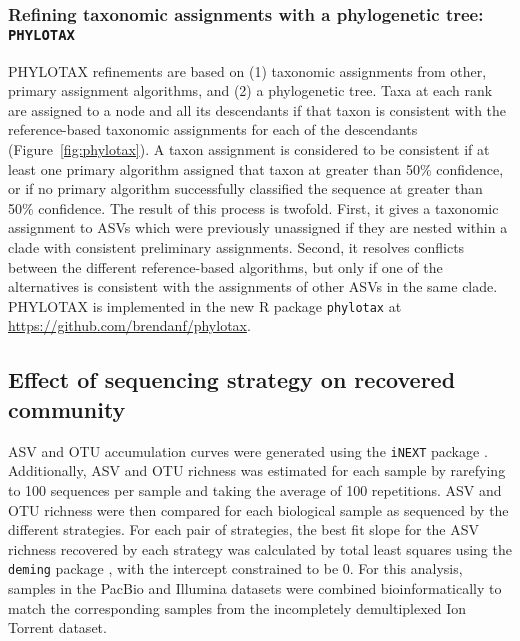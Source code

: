 \documentclass[
]{article}
\begin{document}
\hypertarget{phylotax}{%
\subsubsection{\texorpdfstring{Refining taxonomic assignments with a phylogenetic tree: \texttt{PHYLOTAX}}{Refining taxonomic assignments with a phylogenetic tree: PHYLOTAX}}\label{phylotax}}

PHYLOTAX refinements are based on (1) taxonomic assignments from other, primary assignment algorithms, and (2) a phylogenetic tree.
Taxa at each rank are assigned to a node and all its descendants if that taxon is consistent with the reference-based taxonomic assignments for each of the descendants (Figure~\ref{fig:phylotax}).
A taxon assignment is considered to be consistent if at least one primary algorithm assigned that taxon at greater than 50\% confidence, or if no primary algorithm successfully classified the sequence at greater than 50\% confidence.
The result of this process is twofold.
First, it gives a taxonomic assignment to ASVs which were previously unassigned if they are nested within a clade with consistent preliminary assignments.
Second, it resolves conflicts between the different reference-based algorithms, but only if one of the alternatives is consistent with the assignments of other ASVs in the same clade.
PHYLOTAX is implemented in the new R package \texttt{phylotax} at \url{https://github.com/brendanf/phylotax}.

\hypertarget{sequencing-strategy-supplement}{%
\subsection{Effect of sequencing strategy on recovered community}\label{sequencing-strategy-supplement}}

ASV and OTU accumulation curves were generated using the \texttt{iNEXT} package \autocite{hsieh2016}.
Additionally, ASV and OTU richness was estimated for each sample by rarefying to 100 sequences per sample and taking the average of 100 repetitions.
ASV and OTU richness were then compared for each biological sample as sequenced by the different strategies.
For each pair of strategies, the best fit slope for the ASV richness recovered by each strategy was calculated by total least squares using the \texttt{deming} package \autocite{R-deming}, with the intercept constrained to be 0.
For this analysis, samples in the PacBio and Illumina datasets were combined bioinformatically to match the corresponding samples from the incompletely demultiplexed Ion Torrent dataset.
\end{document}
